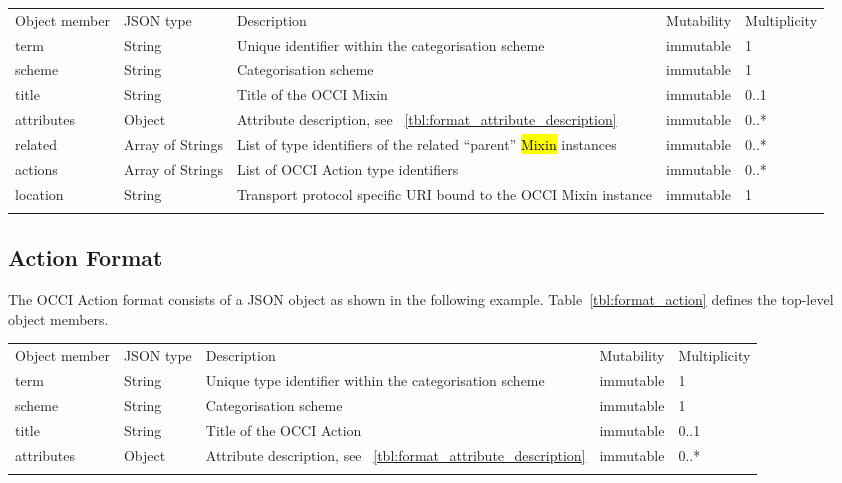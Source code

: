 \documentclass[10pt,a4paper]{article}
\begin{document}
 {
    \begin{tabularx}{\textwidth}{llXll}
    \toprule
    Object member & JSON type & Description & Mutability & Multiplicity \\
    \colrule
    term & String & Unique identifier within the categorisation scheme &
immutable & 1 \\
    scheme & String & Categorisation scheme & immutable & 1 \\
    title & String & Title of the OCCI Mixin & immutable & 0..1 \\
    attributes & Object & Attribute description, see
~\ref{tbl:format_attribute_description} & immutable & 0..* \\
    related & Array of Strings & List of type identifiers of the related
``parent'' \hl{Mixin} instances & immutable & 0..* \\
    actions & Array of Strings & List of OCCI Action type identifiers
& immutable & 0..* \\
    location & String & Transport protocol specific URI bound to the OCCI Mixin
instance & immutable & 1 \\
    \botrule
    \end{tabularx}
}

\subsection{Action Format}
\label{sec:format_action}

The OCCI Action format consists of a JSON object as shown in the
following example.
Table~\ref{tbl:format_action} defines the top-level object members.

 {
    \begin{tabularx}{\textwidth}{llXll}
    \toprule
    Object member & JSON type & Description & Mutability & Multiplicity \\
    \colrule
    term & String & Unique type identifier within the categorisation scheme &
immutable & 1 \\
    scheme & String & Categorisation scheme & immutable & 1 \\
    title & String & Title of the OCCI Action & immutable & 0..1 \\
    attributes & Object & Attribute description, see
~\ref{tbl:format_attribute_description} & immutable & 0..* \\
    \botrule
    \end{tabularx}
}
\end{document}

